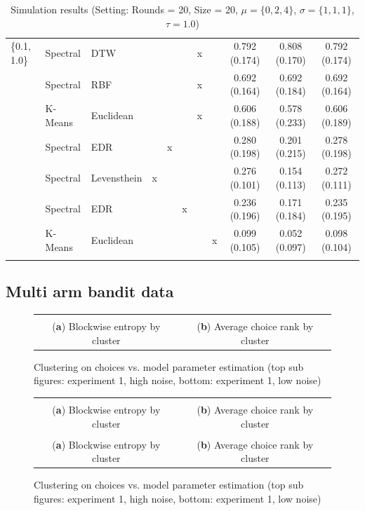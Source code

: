 \documentclass[12pt,a4paper,bibliography=totocnumbered,listof=totocnumbered]{scrartcl}
\begin{document}
{\begin{appendix}
\begin{table}[H]
\begin{tabularx}{\textwidth}{ lllcccccccc}
\{0.1, 1.0\} & Spectral  & DTW &  &  &  & x &  & 0.792 (0.174) & 0.808 (0.170) & 0.792 (0.174) \\ 
& Spectral  & RBF &  &  &  & x &  & 0.692 (0.164) & 0.692 (0.184) & 0.692 (0.164) \\ 
& K-Means & Euclidean  &  &  &  & x &  & 0.606 (0.188) & 0.578 (0.233) & 0.606 (0.189) \\ 
& Spectral  & EDR &  & x &  &  &  & 0.280 (0.198) & 0.201 (0.215) & 0.278 (0.198) \\ 
& Spectral  & Levensthein & x &  &  &  &  & 0.276 (0.101) & 0.154 (0.113) & 0.272 (0.111) \\ 
& Spectral  & EDR &  &  & x &  &  & 0.236 (0.196) & 0.171 (0.184) & 0.235 (0.195) \\ 
& K-Means & Euclidean  &  &  &  &  & x & 0.099 (0.105) & 0.052 (0.097) & 0.098 (0.104) \\ 
\hline \\[-1.8ex] 
	\end{tabularx} 
	\caption{Simulation results (Setting: Rounds = 20, Size = 20, $\mu = \{0,2,4\}$, $\sigma =  \{1,1,1\}$, $\tau = 1.0$)} 
		\label{tab:apstab8}
\end{table} 

\subsection{Multi arm bandit data}

\begin{figure}[H]
	\centering
	\small
	\hspace*{-0.7in}
	\begin{tabular}{cc}
		 &  \\
		(\textbf{a}) Blockwise entropy by cluster & (\textbf{b}) Average choice rank by cluster 
	\end{tabular} \quad
	\caption{Clustering on choices vs. model parameter estimation (top sub figures: experiment 1, high noise, bottom: experiment 1, low noise)}
	\label{fig:cluse1c4}
\end{figure}

\begin{figure}[H]
	\centering
	\small
	\hspace*{-0.7in}
	\begin{tabular}{cc}
			 &  \\
				(\textbf{a}) Blockwise entropy by cluster & (\textbf{b}) Average choice rank by cluster \\
			 &  \\
				(\textbf{a}) Blockwise entropy by cluster & (\textbf{b}) Average choice rank by cluster \\
		\end{tabular} \quad
		\caption{Clustering on choices vs. model parameter estimation (top sub figures: experiment 1, high noise, bottom: experiment 1, low noise)}
		\label{fig:cluse1c3}
\end{figure}



\end{appendix}}
\end{document}
